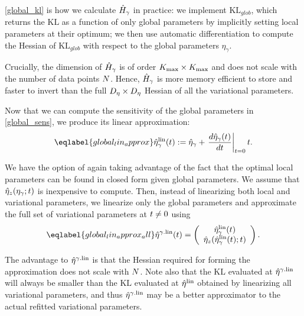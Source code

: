 \eqref{global_kl} is how we calculate $\hat{H}_\gamma$ in practice:
we implement $\mathrm{KL}_{glob}$, which returns the $\mathrm{KL}$ as a function of only global parameters
by implicitly setting local parameters at their optimum;
we then use automatic differentiation to
compute the Hessian of $\mathrm{KL}_{glob}$
with respect to the global parameters $\eta_\gamma$.

Crucially, the dimension of $\hat{H}_\gamma$ is of order ${K_{\mathrm{max}}} \times {K_{\mathrm{max}}}$
and does not scale with the number of data points $N$.
Hence, $\hat{H}_\gamma$ is more memory efficient to store
and faster to invert
than the full ${D_{\eta}}\times{D_{\eta}}$ Hessian of all the variational parameters.


Now that we can compute the sensitivity of the global parameters in
\eqref{global_sens}, we produce its linear approximation:
\begin{align}\eqlabel{global_lin_approx}
  \etalin_\gamma(\t) := \etaopt_\gamma +
  \fracat{d \etaopt_\gamma(\t)}{d \t}{\t=0} \t .
\end{align}

We have the option of again taking advantage of the fact that the optimal
local parameters can be found in closed form given global parameters.
We assume that $\hat\eta_{z}(\eta_\gamma; t)$ is inexpensive to compute.
Then, instead of linearizing both local and variational parameters,
we linearize only the global parameters and approximate
the full set of variational parameters at $t \not= 0$ using
\begin{align}\eqlabel{global_lin_approx_all}
\etalinglobal(\t) = \left(\begin{array}{c} \etalin_\gamma(\t) \\
\etaoptz(\etalin_\gamma(\t); \t)
\end{array}\right).
\end{align}

The advantage to $\hat\eta^{\gamma.\mathrm{lin}}$ is that the Hessian
required for forming the approximation does not scale with $N$.
Note also that the $\mathrm{KL}$ evaluated at $\hat\eta^{\gamma.\mathrm{lin}}$
will always be smaller than the $\mathrm{KL}$ evaluated at $\hat\eta^{\mathrm{lin}}$ obtained by
linearizing all variational parameters,
and thus $\hat\eta^{\gamma.\mathrm{lin}}$ may be a better approximator
to the actual refitted variational parameters.





